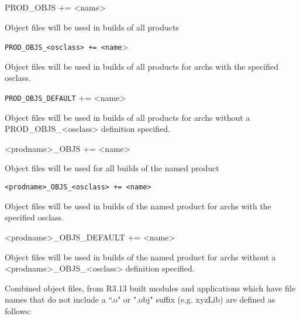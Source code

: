 \begin{description}\item {}PROD\_OBJS += \textless{}name\textgreater{}

\end{description}Object files will be used in builds of all products

\begin{description}\item \verb|PROD_OBJS_<osclass> += <name|\textgreater{}

\end{description}Object files will be used in builds of all products for archs with the specified osclass.

\begin{description}\item \verb|PROD_OBJS_DEFAULT| += \textless{}name\textgreater{}

\end{description}Object files will be used in builds of all products for archs without a PROD\_OBJS\_\textless{}osclass\textgreater{} definition 
specified.

\begin{description}\item \textless{}prodname\textgreater{}\_OBJS += \textless{}name\textgreater{}

\end{description}Object files will be used for all builds of the named product

\begin{description}\item \verb|<prodname>_OBJS_<osclass> += <name>| 

\end{description}Object files will be used in builds of the named product for archs with the specified osclass.

\begin{description}\item \textless{}prodname\textgreater{}\_OBJS\_DEFAULT += \textless{}name\textgreater{}

\end{description}Object files will be used in builds of the named product for archs without a \textless{}prodname\textgreater{}\_OBJS\_\textless{}osclass\textgreater{} 
definition specified.

Combined object files, from R3.13 built modules and applications which have file names that do not include a ``.o" or 
".obj" suffix (e.g. xyzLib) are defined as follows:

